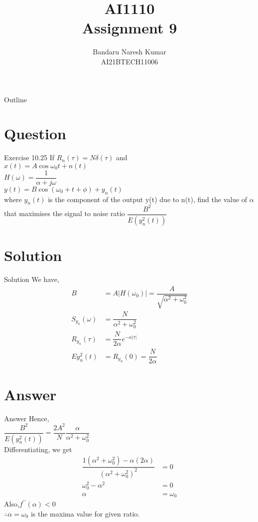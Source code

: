 \documentclass{beamer}
\title{AI1110 \\ Assignment 9}
\author{Bandaru Naresh Kumar \\ AI21BTECH11006}
\date{}
\begin{document}
	\begin{frame}
		\titlepage
	\end{frame}
	
	\begin{frame}{Outline}
    		\tableofcontents
	\end{frame}
	
	\section{Question}
	\begin{frame}{Exercise 10.25}
       If $R_n(\tau) = N\delta(\tau)$ and\\
       $x(t) = A\cos\omega_0t + n(t)$\\
       $H(\omega) = \dfrac{1}{\alpha+j\omega}$\\
       $y(t) = B\cos(\omega_0 +t +\phi) + y_n(t)$\\
       where $y_n(t)$ is the component of the output y(t) due to n(t), find the value of $\alpha$ that maximises the signal to noise ratio $\dfrac{B^2}{E(y_n^2(t))}$
	\end{frame}
	
	\section{Solution}
	\begin{frame}{Solution}
	    We have,\\
	    \begin{align}
	    B &= A|H(\omega_0)| = \dfrac{A}{\sqrt{\alpha^2+\omega_0^2}}\\
	    S_{y_n}(\omega) &= \dfrac{N}{\alpha^2+\omega_0^2}\\
	    R_{y_n}(\tau) &= \dfrac{N}{2\alpha} e^{-\alpha|\tau|}\\
	    E{y_n^2(t)} &= R_{y_n}(0) = \dfrac{N}{2\alpha}
	    \end{align}
	 \end{frame}
	 
	\section{Answer}
	\begin{frame}{Answer}
	   Hence,\\
	    $\dfrac{B^2}{E(y_n^2(t))} = \dfrac{2A^2}{N}\dfrac{\alpha}{\alpha^2+\omega_0^2}$\\
	Differentiating, we get
	\begin{align}
	\dfrac{1(\alpha^2+\omega_0^2)-\alpha(2\alpha)}{(\alpha^2+\omega_0^2)^2} &= 0\\
	\omega_0^2 - \alpha^2 &= 0\\
	\alpha &= \omega_0 
	\end{align}
	Also,$f^{\prime\prime}(\alpha)<0$\\
	$\therefore\alpha = \omega_0$ is the maxima value for given             ratio.
	\end{frame}
\end{document}
